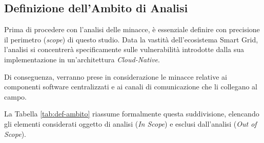 \subsection{Definizione dell'Ambito di Analisi}


Prima di procedere con l'analisi delle minacce, è essenziale definire con precisione il perimetro (\textit{scope}) di questo studio. Data la vastità dell'ecosistema Smart Grid, l'analisi si concentrerà specificamente sulle vulnerabilità introdotte dalla sua implementazione in un'architettura \textit{Cloud-Native}.


Di conseguenza, verranno prese in considerazione le minacce relative ai componenti software centralizzati e ai canali di comunicazione che li collegano al campo. 


La Tabella \ref{tab:def-ambito} riassume formalmente questa suddivisione, elencando gli elementi considerati oggetto di analisi (\textit{In Scope}) e esclusi dall'analisi (\textit{Out of Scope}).

    
         

